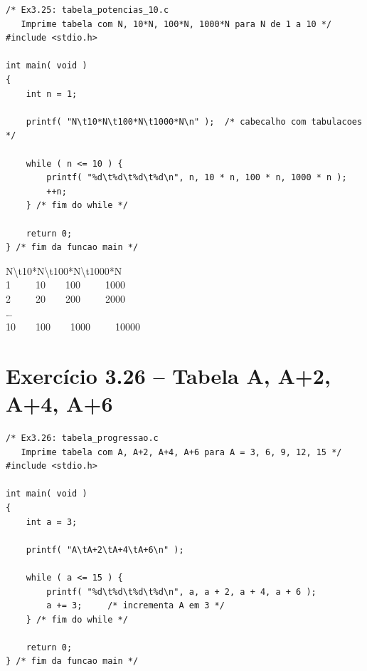 \documentclass[12pt,a4paper]{article}
\begin{document}
\begin{respostabox}
\begin{lstlisting}
/* Ex3.25: tabela_potencias_10.c
   Imprime tabela com N, 10*N, 100*N, 1000*N para N de 1 a 10 */
#include <stdio.h>

int main( void )
{
    int n = 1;

    printf( "N\t10*N\t100*N\t1000*N\n" );  /* cabecalho com tabulacoes */

    while ( n <= 10 ) {
        printf( "%d\t%d\t%d\t%d\n", n, 10 * n, 100 * n, 1000 * n );
        ++n;
    } /* fim do while */

    return 0;
} /* fim da funcao main */
\end{lstlisting}

\begin{saida}
N\textbackslash{}t10*N\textbackslash{}t100*N\textbackslash{}t1000*N\\
1\ \ \ \ \ 10\ \ \ \ 100\ \ \ \ \ 1000\\
2\ \ \ \ \ 20\ \ \ \ 200\ \ \ \ \ 2000\\
\ldots\\
10\ \ \ \ 100\ \ \ \ 1000\ \ \ \ \ 10000
\end{saida}
\end{respostabox}

\section{Exercício 3.26 -- Tabela A, A+2, A+4, A+6}

\begin{respostabox}
\begin{lstlisting}
/* Ex3.26: tabela_progressao.c
   Imprime tabela com A, A+2, A+4, A+6 para A = 3, 6, 9, 12, 15 */
#include <stdio.h>

int main( void )
{
    int a = 3;

    printf( "A\tA+2\tA+4\tA+6\n" );

    while ( a <= 15 ) {
        printf( "%d\t%d\t%d\t%d\n", a, a + 2, a + 4, a + 6 );
        a += 3;     /* incrementa A em 3 */
    } /* fim do while */

    return 0;
} /* fim da funcao main */
\end{lstlisting}
\end{respostabox}

\newpage

\end{document}
